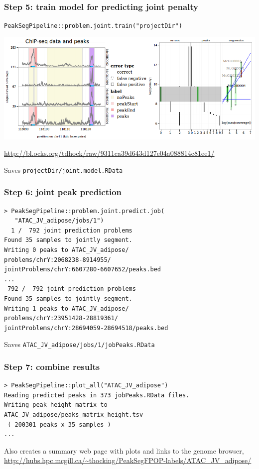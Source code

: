\documentclass{beamer}
\begin{document}
\begin{frame}[fragile]
  \frametitle{Step 5: train model for predicting joint penalty}
  
  \verb|PeakSegPipeline::problem.joint.train("projectDir")|

  \includegraphics[width=\textwidth]{Screenshot-interval-regression}

  \url{http://bl.ocks.org/tdhock/raw/9311ca39d643d127e04a088814c81ee1/}

  Saves \verb|projectDir/joint.model.RData|
\end{frame}

\begin{frame}
  \frametitle{Step 6: joint peak prediction}
\small
\begin{verbatim}
> PeakSegPipeline::problem.joint.predict.job(
   "ATAC_JV_adipose/jobs/1")
  1 /  792 joint prediction problems
Found 35 samples to jointly segment.
Writing 0 peaks to ATAC_JV_adipose/
problems/chrY:2068238-8914955/
jointProblems/chrY:6607280-6607652/peaks.bed
...
 792 /  792 joint prediction problems
Found 35 samples to jointly segment.
Writing 1 peaks to ATAC_JV_adipose/
problems/chrY:23951428-28819361/
jointProblems/chrY:28694059-28694518/peaks.bed
\end{verbatim}

Saves \verb|ATAC_JV_adipose/jobs/1/jobPeaks.RData|

\end{frame}

\begin{frame}[fragile]
  \frametitle{Step 7: combine results}

\begin{verbatim}
> PeakSegPipeline::plot_all("ATAC_JV_adipose")
Reading predicted peaks in 373 jobPeaks.RData files.
Writing peak height matrix to 
ATAC_JV_adipose/peaks_matrix_height.tsv
 ( 200301 peaks x 35 samples )
...
\end{verbatim}

  Also creates a summary web page with plots and links to the genome
  browser,
  \url{http://hubs.hpc.mcgill.ca/~thocking/PeakSegFPOP-labels/ATAC_JV_adipose/}

\end{frame}
\end{document}
